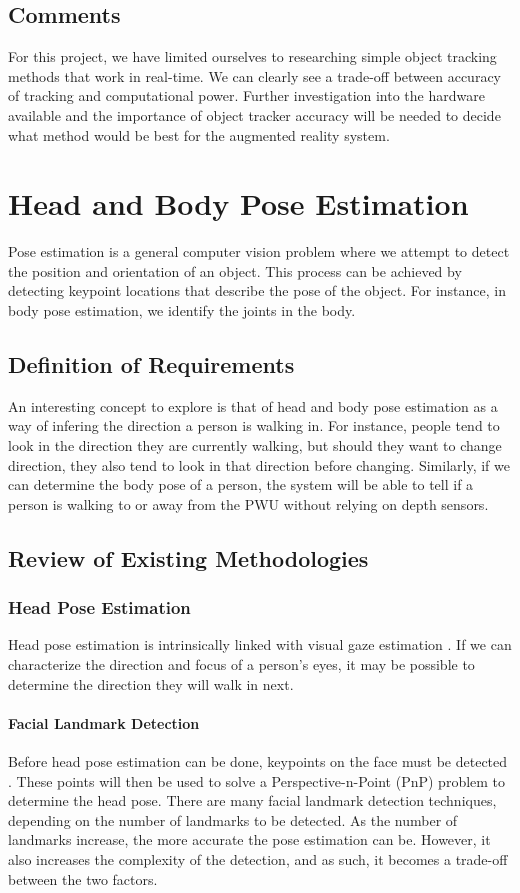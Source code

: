 \subsection{Comments}
For this project, we have limited ourselves to researching simple object tracking methods that work in real-time. We can clearly see a trade-off between accuracy of tracking and computational power. Further investigation into the hardware available and the importance of object tracker accuracy will be needed to decide what method would be best for the augmented reality system.

\section{Head and Body Pose Estimation}
Pose estimation is a general computer vision problem where we attempt to detect the position and orientation of an object. This process can be achieved by detecting keypoint locations that describe the pose of the object. For instance, in body pose estimation, we identify the joints in the body.

\subsection{Definition of Requirements}
An interesting concept to explore is that of head and body pose estimation as a way of infering the direction a person is walking in. For instance, people tend to look in the direction they are currently walking, but should they want to change direction, they also tend to look in that direction before changing. Similarly, if we can determine the body pose of a person, the system will be able to tell if a person is walking to or away from the PWU without relying on depth sensors.

\subsection{Review of Existing Methodologies}

\subsubsection{Head Pose Estimation}
Head pose estimation is intrinsically linked with visual gaze estimation \cite{Murphy-Chutorian2009}. If we can characterize the direction and focus of a person's eyes, it may be possible to determine the direction they will walk in next.

\paragraph{Facial Landmark Detection}
Before head pose estimation can be done, keypoints on the face must be detected \cite{Kazemi2014}. These points will then be used to solve a Perspective-n-Point (PnP) problem to determine the head pose. There are many facial landmark detection techniques, depending on the number of landmarks to be detected. As the number of landmarks increase, the more accurate the pose estimation can be. However, it also increases the complexity of the detection, and as such, it becomes a trade-off between the two factors.

